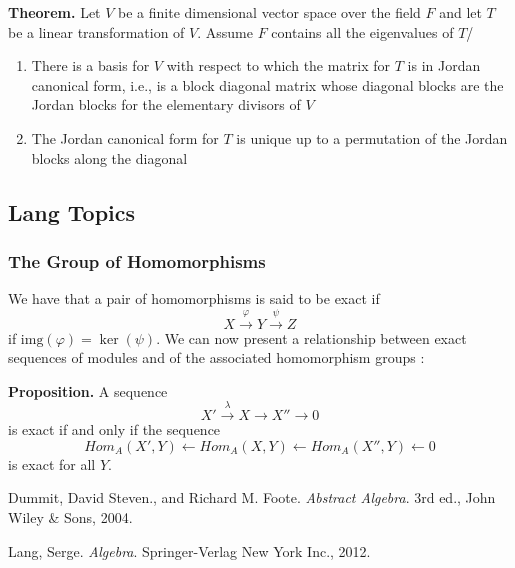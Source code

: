 \documentclass[11pt, reqno]{amsart}
\theoremstyle{plain}
\theoremstyle{definition}
\theoremstyle{example}
\begin{document}
\par
\textbf{Theorem.} Let $V$ be a finite dimensional vector space over the field $F$ and let $T$ be a linear transformation of $V$. Assume $F$ contains all the eigenvalues of $T$/
\begin{enumerate}
\item There is a basis for $V$ with respect to which the matrix for $T$ is in Jordan canonical form, i.e., is a block diagonal matrix whose diagonal blocks are the Jordan blocks for the elementary divisors of $V$
\item The Jordan canonical form for $T$ is unique up to a permutation of the Jordan blocks along the diagonal
\end{enumerate}

\subsection{Lang Topics}

\subsubsection{The Group of Homomorphisms}

We have that a pair of homomorphisms is said to be exact if $$X \xrightarrow{\varphi} Y \xrightarrow{\psi} Z$$ if $\text{img}(\varphi) = \ker(\psi)$. We can now present a relationship between exact sequences of modules and of the associated homomorphism groups \cite[\S 2.2, p. 122]{lang}:

\par
\textbf{Proposition.} A sequence 
$$X' \xrightarrow{\lambda} X \to X'' \to 0$$ is exact if and only if the sequence $$Hom_A(X', Y) \leftarrow Hom_A(X, Y) \leftarrow  Hom_A(X'', Y) \leftarrow 0$$ is exact for all $Y$.





\newpage
\begin{thebibliography}{9}

Dummit, David Steven., and Richard M. Foote. \textit{Abstract Algebra}. 3rd ed., John Wiley \& Sons, 2004. 

Lang, Serge. \textit{Algebra}. Springer-Verlag New York Inc., 2012. 

\end{thebibliography}
\end{document}
